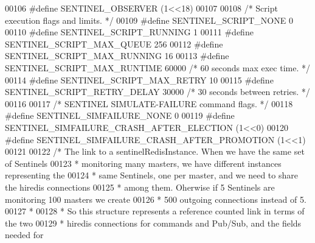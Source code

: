 \begin{DoxyCode}
00106 \textcolor{preprocessor}{#}\textcolor{preprocessor}{define} \textcolor{preprocessor}{SENTINEL\_OBSERVER} \textcolor{preprocessor}{(}1\textcolor{preprocessor}{<<}18\textcolor{preprocessor}{)}
00107 
00108 \textcolor{comment}{/* Script execution flags and limits. */}
00109 \textcolor{preprocessor}{#}\textcolor{preprocessor}{define} \textcolor{preprocessor}{SENTINEL\_SCRIPT\_NONE} 0
00110 \textcolor{preprocessor}{#}\textcolor{preprocessor}{define} \textcolor{preprocessor}{SENTINEL\_SCRIPT\_RUNNING} 1
00111 \textcolor{preprocessor}{#}\textcolor{preprocessor}{define} \textcolor{preprocessor}{SENTINEL\_SCRIPT\_MAX\_QUEUE} 256
00112 \textcolor{preprocessor}{#}\textcolor{preprocessor}{define} \textcolor{preprocessor}{SENTINEL\_SCRIPT\_MAX\_RUNNING} 16
00113 \textcolor{preprocessor}{#}\textcolor{preprocessor}{define} \textcolor{preprocessor}{SENTINEL\_SCRIPT\_MAX\_RUNTIME} 60000 \textcolor{comment}{/* 60 seconds max exec time. */}
00114 \textcolor{preprocessor}{#}\textcolor{preprocessor}{define} \textcolor{preprocessor}{SENTINEL\_SCRIPT\_MAX\_RETRY} 10
00115 \textcolor{preprocessor}{#}\textcolor{preprocessor}{define} \textcolor{preprocessor}{SENTINEL\_SCRIPT\_RETRY\_DELAY} 30000 \textcolor{comment}{/* 30 seconds between retries. */}
00116 
00117 \textcolor{comment}{/* SENTINEL SIMULATE-FAILURE command flags. */}
00118 \textcolor{preprocessor}{#}\textcolor{preprocessor}{define} \textcolor{preprocessor}{SENTINEL\_SIMFAILURE\_NONE} 0
00119 \textcolor{preprocessor}{#}\textcolor{preprocessor}{define} \textcolor{preprocessor}{SENTINEL\_SIMFAILURE\_CRASH\_AFTER\_ELECTION} \textcolor{preprocessor}{(}1\textcolor{preprocessor}{<<}0\textcolor{preprocessor}{)}
00120 \textcolor{preprocessor}{#}\textcolor{preprocessor}{define} \textcolor{preprocessor}{SENTINEL\_SIMFAILURE\_CRASH\_AFTER\_PROMOTION} \textcolor{preprocessor}{(}1\textcolor{preprocessor}{<<}1\textcolor{preprocessor}{)}
00121 
00122 \textcolor{comment}{/* The link to a sentinelRedisInstance. When we have the same set of Sentinels}
00123 \textcolor{comment}{ * monitoring many masters, we have different instances representing the}
00124 \textcolor{comment}{ * same Sentinels, one per master, and we need to share the hiredis connections}
00125 \textcolor{comment}{ * among them. Oherwise if 5 Sentinels are monitoring 100 masters we create}
00126 \textcolor{comment}{ * 500 outgoing connections instead of 5.}
00127 \textcolor{comment}{ *}
00128 \textcolor{comment}{ * So this structure represents a reference counted link in terms of the two}
00129 \textcolor{comment}{ * hiredis connections for commands and Pub/Sub, and the fields needed for}

\end{DoxyCode}
